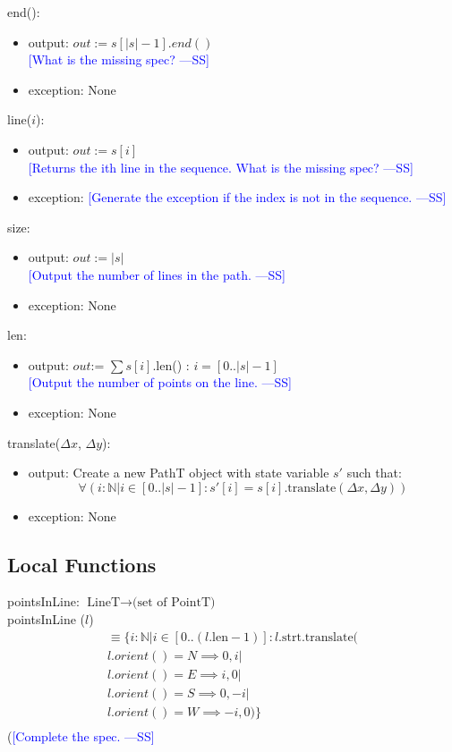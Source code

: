 \documentclass[12pt]{article}
\newcommand{\authornote}[3]{\textcolor{#1}{[#3 ---#2]}}
\newcommand{\authornote}[3]{}
\newcommand{\wss}[1]{\authornote{blue}{SS}{#1}}
\begin{document}
\noindent end():
\begin{itemize}
\item output: $out := s[|s|-1].end()$\\
\wss{What is the missing spec?}
\item exception: None
\end{itemize}

\noindent line($i$):
\begin{itemize}
\item output: $out := s[i]$\\
\wss{Returns the ith line in the sequence.  What is the missing spec?}
\item exception: \wss{Generate the exception if the index is not in the sequence.}
\end{itemize}

\noindent size:
\begin{itemize}
\item output: $out:=|s|$\\
\wss{Output the number of lines in the path.}
\item exception: None
\end{itemize}

\noindent len:
\begin{itemize}
\item output: $out$:= $\sum s[i]$.len() : $i = [0..|s| - 1]$\\
\wss{Output the number of points on the line.}
\item exception: None
\end{itemize}

\noindent translate($\Delta x$, $\Delta y$):
\begin{itemize}
\item output: Create a new PathT object with state variable $s'$ such that:
$$\forall(i: \mathbb{N} | i \in [0..|s|-1] : s'[i] = s[i].\mbox{translate}(\Delta x, \Delta y))$$
\item exception: None
\end{itemize}

\subsection*{Local Functions}

pointsInLine: $\mbox{LineT} \rightarrow \mbox{(set of PointT)}$\\

\noindent pointsInLine ($l$) 
\begin{multline*}
\equiv \{ i: \mathbb{N} | i \in [0
  .. (l.\mbox{len} - 1)] : l.\mbox{strt}.\mbox{translate}(\\l.orient() = N \implies 0, i|\\
  l.orient() = E \implies i, 0|\\
  l.orient() = S \implies 0, -i|\\
  l.orient() = W \implies -i, 0)\}\\
\end{multline*} (\wss{Complete the spec.}
\end{document}
